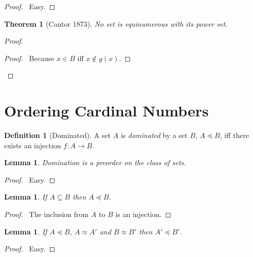 \documentclass{report}
\let\qed\relax
\newtheorem{lemma}[axiom]{Lemma}
\newtheorem{theorem}[axiom]{Theorem}
\theoremstyle{definition}
\newtheorem{definition}[axiom]{Definition}
\begin{document}
    \begin{proof}
        \pf\ Easy. \qed
    \end{proof}

    \begin{theorem}[Cantor 1873]
        No set is equinumerous with its power set.
    \end{theorem}

    \begin{proof}
        \pf
        \begin{proof}
            \pf\ Because $x \in B$ iff $x \notin g(x)$.
        \end{proof}
        \qed
    \end{proof}

    \section{Ordering Cardinal Numbers}

    \begin{definition}[Dominated]
        A set $A$ is \emph{dominated} by a set $B$, $A \preccurlyeq B$, iff there exists an injection
        $f : A \rightarrow B$.
    \end{definition}

    \begin{lemma}
        Domination is a preorder on the class of sets.
    \end{lemma}

    \begin{proof}
        \pf\ Easy. \qed
    \end{proof}

    \begin{lemma}
        If $A \subseteq B$ then $A \preccurlyeq B$.
    \end{lemma}

    \begin{proof}
        \pf\ The inclusion from $A$ to $B$ is an injection. \qed
    \end{proof}

    \begin{lemma}
        If $A \preccurlyeq B$, $A \approx A'$ and $B \approx B'$ then $A' \preccurlyeq B'$.
    \end{lemma}
    
    \begin{proof}
        \pf\ Easy. \qed
    \end{proof}
\end{document}
